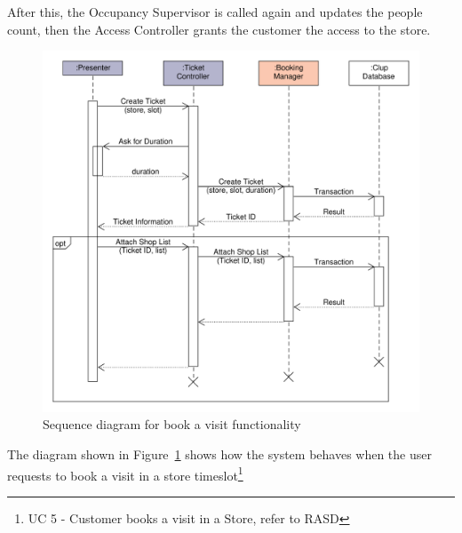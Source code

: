 After this, the Occupancy Supervisor is called again and updates the people count, then the Access Controller grants the customer the access to the store.
\begin{figure}[H]
    \includegraphics[width=\textwidth]{Images/UML_user_book_visit.pdf}
    \caption{\label{fig:UML_user_book_visit}Sequence diagram for book a visit functionality}
\end{figure}
The diagram shown in Figure~\ref{fig:UML_user_book_visit} shows how the system behaves when the user requests to book a visit in a store timeslot\footnote{UC 5 - Customer books a visit in a Store, refer to RASD}

